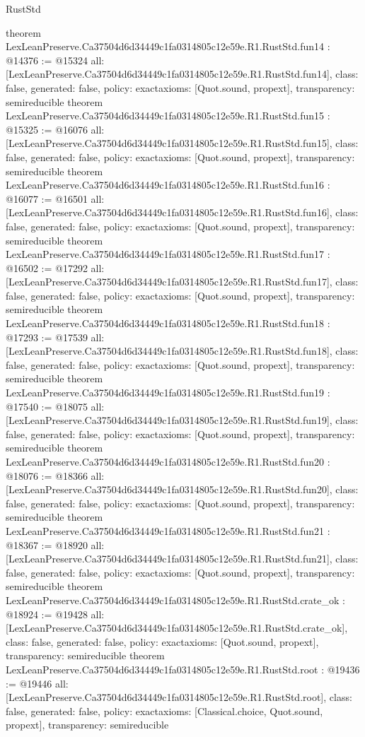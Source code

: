 \begin{lexlean}{RustStd}
\begin{coremodule}
{}
theorem LexLeanPreserve.Ca37504d6d34449c1fa0314805c12e59e.R1.RustStd.fun14 : @14376 := @15324 {
  all: [LexLeanPreserve.Ca37504d6d34449c1fa0314805c12e59e.R1.RustStd.fun14],
  class: false,
  generated: false,
  policy: exact{axioms: [Quot.sound, propext]},
  transparency: semireducible
}
theorem LexLeanPreserve.Ca37504d6d34449c1fa0314805c12e59e.R1.RustStd.fun15 : @15325 := @16076 {
  all: [LexLeanPreserve.Ca37504d6d34449c1fa0314805c12e59e.R1.RustStd.fun15],
  class: false,
  generated: false,
  policy: exact{axioms: [Quot.sound, propext]},
  transparency: semireducible
}
theorem LexLeanPreserve.Ca37504d6d34449c1fa0314805c12e59e.R1.RustStd.fun16 : @16077 := @16501 {
  all: [LexLeanPreserve.Ca37504d6d34449c1fa0314805c12e59e.R1.RustStd.fun16],
  class: false,
  generated: false,
  policy: exact{axioms: [Quot.sound, propext]},
  transparency: semireducible
}
theorem LexLeanPreserve.Ca37504d6d34449c1fa0314805c12e59e.R1.RustStd.fun17 : @16502 := @17292 {
  all: [LexLeanPreserve.Ca37504d6d34449c1fa0314805c12e59e.R1.RustStd.fun17],
  class: false,
  generated: false,
  policy: exact{axioms: [Quot.sound, propext]},
  transparency: semireducible
}
theorem LexLeanPreserve.Ca37504d6d34449c1fa0314805c12e59e.R1.RustStd.fun18 : @17293 := @17539 {
  all: [LexLeanPreserve.Ca37504d6d34449c1fa0314805c12e59e.R1.RustStd.fun18],
  class: false,
  generated: false,
  policy: exact{axioms: [Quot.sound, propext]},
  transparency: semireducible
}
theorem LexLeanPreserve.Ca37504d6d34449c1fa0314805c12e59e.R1.RustStd.fun19 : @17540 := @18075 {
  all: [LexLeanPreserve.Ca37504d6d34449c1fa0314805c12e59e.R1.RustStd.fun19],
  class: false,
  generated: false,
  policy: exact{axioms: [Quot.sound, propext]},
  transparency: semireducible
}
theorem LexLeanPreserve.Ca37504d6d34449c1fa0314805c12e59e.R1.RustStd.fun20 : @18076 := @18366 {
  all: [LexLeanPreserve.Ca37504d6d34449c1fa0314805c12e59e.R1.RustStd.fun20],
  class: false,
  generated: false,
  policy: exact{axioms: [Quot.sound, propext]},
  transparency: semireducible
}
theorem LexLeanPreserve.Ca37504d6d34449c1fa0314805c12e59e.R1.RustStd.fun21 : @18367 := @18920 {
  all: [LexLeanPreserve.Ca37504d6d34449c1fa0314805c12e59e.R1.RustStd.fun21],
  class: false,
  generated: false,
  policy: exact{axioms: [Quot.sound, propext]},
  transparency: semireducible
}
theorem LexLeanPreserve.Ca37504d6d34449c1fa0314805c12e59e.R1.RustStd.crate_ok : @18924 := @19428 {
  all: [LexLeanPreserve.Ca37504d6d34449c1fa0314805c12e59e.R1.RustStd.crate_ok],
  class: false,
  generated: false,
  policy: exact{axioms: [Quot.sound, propext]},
  transparency: semireducible
}
theorem LexLeanPreserve.Ca37504d6d34449c1fa0314805c12e59e.R1.RustStd.root : @19436 := @19446 {
  all: [LexLeanPreserve.Ca37504d6d34449c1fa0314805c12e59e.R1.RustStd.root],
  class: false,
  generated: false,
  policy: exact{axioms: [Classical.choice, Quot.sound, propext]},
  transparency: semireducible
}


\end{coremodule}
\end{lexlean}
